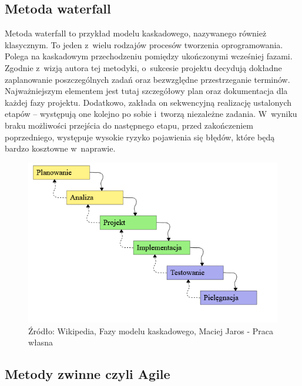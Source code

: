 \documentclass[oneside,polski,logo]{amuthesis}
\begin{document}
\subsection {Metoda waterfall}
Metoda waterfall to przykład modelu kaskadowego, nazywanego również klasycznym. To jeden z~wielu rodzajów procesów tworzenia oprogramowania. Polega na kaskadowym przechodzeniu pomiędzy ukończonymi wcześniej fazami. Zgodnie z~wizją autora tej metodyki, o~sukcesie projektu decydują dokładne zaplanowanie poszczególnych zadań oraz bezwzględne przestrzeganie terminów. Najważniejszym elementem jest tutaj szczegółowy plan oraz dokumentacja dla każdej fazy projektu. Dodatkowo, zakłada on sekwencyjną realizację ustalonych etapów – występują one kolejno po sobie i~tworzą niezależne zadania. W~wyniku braku możliwości przejścia do następnego etapu, przed zakończeniem poprzedniego, występuje wysokie ryzyko pojawienia się błędów, które będą bardzo kosztowne w~naprawie. \cite{waterfall}

\begin{figure}[h]
	\centering
	\includegraphics[width=14cm]{images/hyps/waterfall.png}
	\caption{Źródło: Wikipedia, Fazy modelu kaskadowego, Maciej Jaros - Praca własna}
\end{figure}

\subsection{Metody zwinne czyli Agile}
\end{document}
